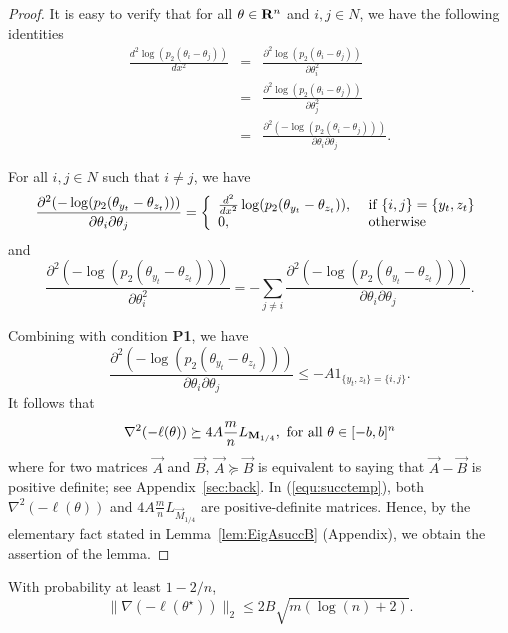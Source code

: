 \begin{proof} It is easy to verify that for all $\theta \in \mathbf{R}^n$ and $i,j\in N$, we have the following identities
\begin{eqnarray*}
\frac{d^2 \log(p_2(\theta_i - \theta_j))}{dx^2} &=& \frac{\partial^2 \log(p_2(\theta_i - \theta_j))}{\partial \theta_i^2}\\
& = & \frac{\partial^2 \log(p_2(\theta_i - \theta_j))}{\partial \theta_j^2}\\
& = & \frac{\partial^2 (-\log(p_2(\theta_i - \theta_j)))}{\partial \theta_i\partial \theta_j}.
\end{eqnarray*}

For all $i,j\in N$ such that $i\neq j$, we have
$$
\frac{\partial^2 (-\log(p_2(\theta_{y_t}-\theta_{z_t})))}{\partial \theta_i \partial \theta_j} = \left\{
\begin{array}{ll}
\frac{d^2}{dx^2}\log(p_2(\theta_{y_t}-\theta_{z_t})), & \hbox{ if } \{i,j\} = \{y_t,z_t\}\\
0, & \hbox{ otherwise}
\end{array}
\right .
$$
and 
$$
\frac{\partial^2 (-\log(p_2(\theta_{y_t}-\theta_{z_t})))}{\partial \theta_i^2} = - \sum_{j\neq i} \frac{\partial^2 (-\log(p_2(\theta_{y_t}-\theta_{z_t})))}{\partial \theta_i \partial \theta_j}.
$$

Combining with condition {\bf P1}, we have
$$
\frac{\partial^2 (-\log(p_2(\theta_{y_t}-\theta_{z_t})))}{\partial \theta_i \partial \theta_j} \leq -A 1_{\{y_t,z_t\}=\{i,j\}}.
$$
It follows that 
\begin{equation}
\nabla^2(-\ell(\theta)) \succeq 4A\frac{m}{n}L_{\vec{M}_{1/4}}, \hbox{ for all } \theta \in [-b,b]^n
\label{equ:succtemp}
\end{equation}
where for two matrices $\vec{A}$ and $\vec{B}$, $\vec{A} \succeq \vec{B}$ is equivalent to saying that $\vec{A}-\vec{B}$ is positive definite; see Appendix~\ref{sec:back}. In (\ref{equ:succtemp}), both $\nabla^2(-\ell(\theta))$ and $4A\frac{m}{n}L_{\vec{M}_{1/4}}$ are positive-definite matrices. Hence, by the elementary fact stated in Lemma~\ref{lem:EigAsuccB} (Appendix), we obtain the assertion of the lemma.
\end{proof}

\begin{lemma} With probability at least $1-2/n$,
$$
\|\nabla(-\ell(\theta^\star))\|_2 \leq 2B\sqrt{m(\log(n)+2)}.
$$
\label{lem:LT22}
\end{lemma}

